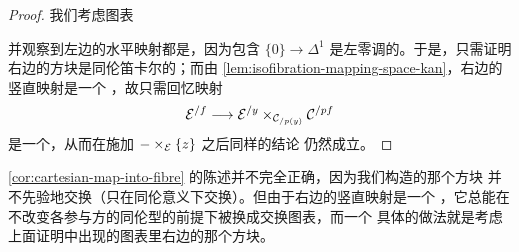 \begin{proof}
我们考虑图表
\begin{center}
\end{center}
并观察到左边的水平映射都是\trTrivialFibration{}，因为包含 $\{0\} \to \Delta^1$
是左零调的。于是，只需证明右边的方块是同伦笛卡尔的；而由%
\cref{lem:isofibration-mapping-space-kan}，右边的竖直映射是一个%
\trKanFibration{}，故只需回忆映射
\[
\mathcal{E}^{/f} \longrightarrow \mathcal{E}^{/y} \times_{\mathcal{C}_{/p(y)}} \mathcal{C}^{/pf}
\]
是一个\trTrivialFibration{}，从而在施加 $- \times_{\mathcal{E}} \{z\}$ 之后同样的结论
仍然成立。
\end{proof}

\begin{remark}\label{rem:cartesian-map-not-commutative}
\cref{cor:cartesian-map-into-fibre} 的陈述并不完全正确，因为我们构造的那个方块
并不先验地交换（只在同伦意义下交换）。但由于右边的竖直映射是一个%
\trKanFibration{}，它总能在不改变各参与方的同伦型的前提下被换成交换图表，而一个
具体的做法就是考虑上面证明中出现的图表里右边的那个方块。
\end{remark}

